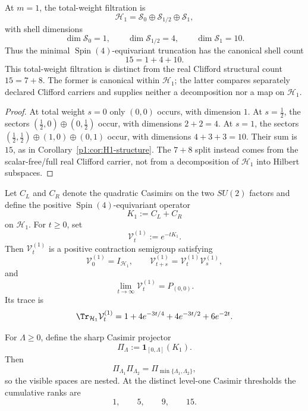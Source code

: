 \documentclass[11pt]{article}
\begin{document}
\begin{corollary}
\label{p1:cor:m1-shell-counts}
At \(m=1\), the total-weight filtration is
\[
\mathcal H_1=
\mathcal S_0\oplus\mathcal S_{1/2}\oplus\mathcal S_1,
\]
with shell dimensions
\[
\dim\mathcal S_0=1,
\qquad
\dim\mathcal S_{1/2}=4,
\qquad
\dim\mathcal S_1=10.
\]
Thus the minimal \(\operatorname{Spin}(4)\)-equivariant truncation has the canonical shell
count
\[
15=1+4+10.
\]
This total-weight filtration is distinct from the real Clifford structural
count \(15=7+8\).  The former is canonical within \(\mathcal H_1\); the latter
compares separately declared Clifford carriers and supplies neither a
decomposition nor a map on \(\mathcal H_1\).
\end{corollary}

\begin{proof}
At total weight \(s=0\) only \((0,0)\) occurs, with dimension \(1\).  At
\(s=\frac12\), the sectors \((\frac12,0)\oplus(0,\frac12)\) occur, with
dimensions \(2+2=4\).  At \(s=1\), the sectors
\((\frac12,\frac12)\oplus(1,0)\oplus(0,1)\) occur, with dimensions \(4+3+3=10\).
Their sum is \(15\), as in Corollary~\ref{p1:cor:H1-structure}.  The
\(7+8\) split instead comes from the scalar-free/full real Clifford carrier, not
from a decomposition of \(\mathcal H_1\) into Hilbert subspaces.
\end{proof}

\begin{theorem}
\label{p1:thm:s3one-casimir-scale-space}
Let \(C_L\) and \(C_R\) denote the quadratic Casimirs on the two
\(SU(2)\) factors and define the positive \(\operatorname{Spin}(4)\)-equivariant operator
\[
    K_1:=C_L+C_R
\]
on \(\mathcal H_1\).  For \(t\ge0\), set
\[
    \mathcal V_t^{(1)}:=e^{-tK_1}.
\]
Then \(\mathcal V_t^{(1)}\) is a positive contraction semigroup satisfying
\[
    \mathcal V_0^{(1)}=I_{\mathcal H_1},
    \qquad
    \mathcal V_{t+s}^{(1)}
    =\mathcal V_t^{(1)}\mathcal V_s^{(1)},
\]
and
\[
    \lim_{t\to\infty}\mathcal V_t^{(1)}=P_{(0,0)}.
\]
Its trace is
\[
    \Tr_{\mathcal H_1}\mathcal V_t^{(1)}
    =1+4e^{-3t/4}+4e^{-3t/2}+6e^{-2t}.
\]

For \(\Lambda\ge0\), define the sharp Casimir projector
\[
    \Pi_\Lambda:=\mathbf1_{[0,\Lambda]}(K_1).
\]
Then
\[
    \Pi_{\Lambda_1}\Pi_{\Lambda_2}
    =\Pi_{\min\{\Lambda_1,\Lambda_2\}},
\]
so the visible spaces are nested.  At the distinct level-one Casimir thresholds
the cumulative ranks are
\[
    1,\qquad5,\qquad9,\qquad15.
\]
\end{theorem}
\end{document}
